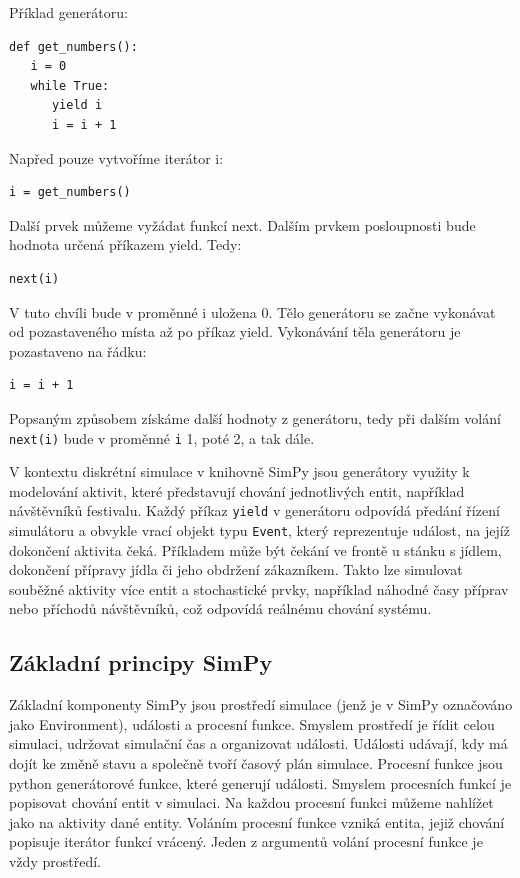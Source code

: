 \documentclass[12pt,a4paper]{article}
\begin{document}
\noindent Příklad generátoru:
 \begin{verbatim} 
def get_numbers():
   i = 0
   while True:
      yield i
      i = i + 1
\end{verbatim}
Napřed pouze vytvoříme iterátor i: 
 \begin{verbatim} 
i = get_numbers()
\end{verbatim}
Další prvek můžeme vyžádat funkcí next. 
Dalším prvkem posloupnosti bude hodnota určená příkazem yield. Tedy:
 \begin{verbatim} 
next(i)
\end{verbatim}
V tuto chvíli bude v proměnné i uložena 0. Tělo generátoru se začne vykonávat od pozastaveného místa až po příkaz yield.  Vykonávání těla generátoru je pozastaveno na řádku:
 \begin{verbatim} 
i = i + 1
\end{verbatim}
Popsaným způsobem získáme další hodnoty z generátoru, tedy při dalším volání \texttt{next(i)} bude v proměnné \texttt{i} 1, poté 2, a tak dále.

V kontextu diskrétní simulace v knihovně SimPy jsou generátory využity k modelování aktivit, které představují chování jednotlivých entit, například návštěvníků festivalu. Každý příkaz \texttt{yield} v generátoru odpovídá předání řízení simulátoru a obvykle vrací objekt typu \texttt{Event}, který reprezentuje událost, na jejíž dokončení aktivita čeká. Příkladem může být čekání ve frontě u stánku s jídlem, dokončení přípravy jídla či jeho obdržení zákazníkem. Takto lze simulovat souběžné aktivity více entit a stochastické prvky, například náhodné časy příprav nebo příchodů návštěvníků, což odpovídá reálnému chování systému.

\subsection{Základní principy SimPy}
Základní komponenty SimPy jsou prostředí simulace (jenž je v SimPy označováno jako Environment), události a procesní funkce. Smyslem prostředí je řídit celou simulaci, udržovat simulační čas a organizovat události. Události udávají, kdy má dojít ke změně stavu a společně tvoří časový plán simulace. Procesní funkce jsou python generátorové funkce, které generují události. Smyslem procesních funkcí je popisovat chování entit v simulaci. Na každou procesní funkci můžeme nahlížet jako na aktivity dané entity. Voláním procesní funkce vzniká entita, jejiž chování popisuje iterátor funkcí vrácený. Jeden z argumentů volání procesní funkce je vždy prostředí.
\end{document}
